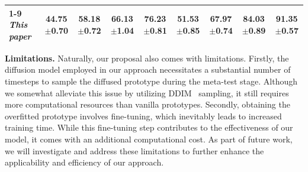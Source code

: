 \begin{table}[t]
{\begin{tabular}{lcccccccc}
\cmidrule{1-9}
\rowcolor{softblue}
\textbf{\textit{This paper}} & \textbf{44.75}\textcolor{mygray}{\scriptsize{$\pm$0.70}}  & \textbf{58.18}\textcolor{mygray}{\scriptsize{$\pm$0.72}}  & \textbf{66.13}\textcolor{mygray}{\scriptsize{$\pm$1.04}}   & {76.23}\textcolor{mygray}{\scriptsize{$\pm$0.81}}  &\textbf{51.53}\textcolor{mygray}{\scriptsize{$\pm$0.85}}  & \textbf{67.97}\textcolor{mygray}{\scriptsize{$\pm$0.74}}  &\textbf{84.03}\textcolor{mygray}{\scriptsize{$\pm$0.89}}    & \textbf{91.35}\textcolor{mygray}{\scriptsize{$\pm$0.57}}  \\
\bottomrule
\end{tabular}}
\vspace{-6mm}
\label{tab:few-task}
\end{table}

\textbf{Limitations.} Naturally, our proposal also comes with limitations. Firstly, the diffusion model employed in our approach necessitates a substantial number of timesteps to sample the diffused prototype during the meta-test stage. Although we somewhat alleviate this issue by utilizing DDIM~\cite{song2020denoising} sampling, it still requires more computational resources than vanilla prototypes.
Secondly, obtaining the overfitted prototype involves fine-tuning, which inevitably leads to increased training time. While this fine-tuning step contributes to the effectiveness of our model, it comes with an additional computational cost.
As part of future work, we will investigate and address these limitations to further enhance the applicability and efficiency of our approach.